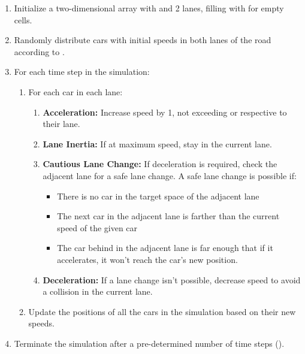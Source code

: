 \documentclass{article}
\begin{document}
\begin{enumerate}
    \item 
    Initialize a two-dimensional array  with  and 2 lanes, filling with  for empty cells. 

    \item
    Randomly distribute cars with initial speeds in both lanes of the road according to . 

    \item
    For each time step  in the simulation: 
    \begin{enumerate}
        \item 
        For each car in each lane: 
        \begin{enumerate}
            \item 
            \textbf{Acceleration:} Increase speed by 1, not exceeding  or  respective to their lane. 

            \item 
            \textbf{Lane Inertia:} If at maximum speed, stay in the current lane. 

            \item
            \textbf{Cautious Lane Change:} If deceleration is required, check the adjacent lane for a safe lane change. A safe lane change is possible if: 
            \begin{itemize}
                \item 
                There is no car in the target space of the adjacent lane
                \item
                The next car in the adjacent lane is farther than the current speed of the given car
                \item 
                The car behind in the adjacent lane is far enough that if it accelerates, it won't reach the car's new position.
            \end{itemize}

            \item
            \textbf{Deceleration:} If a lane change isn't possible, decrease speed to avoid a collision in the current lane. 
        \end{enumerate}

        \item
        Update the positions of all the cars in the simulation based on their new speeds. 
    \end{enumerate}

    \item 
    Terminate the simulation after a pre-determined number of time steps (). 
\end{enumerate}
\end{document}

